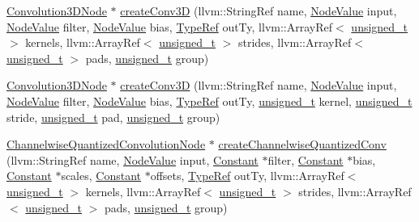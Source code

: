 \begin{DoxyCompactItemize}
\item 
\hyperlink{classglow_1_1_convolution3_d_node}{Convolution3\+D\+Node} $\ast$ \hyperlink{classglow_1_1_function_a5eec756ea2779f3768102cd496cce846}{create\+Conv3D} (llvm\+::\+String\+Ref name, \hyperlink{structglow_1_1_node_value}{Node\+Value} input, \hyperlink{structglow_1_1_node_value}{Node\+Value} filter, \hyperlink{structglow_1_1_node_value}{Node\+Value} bias, \hyperlink{structglow_1_1_type}{Type\+Ref} out\+Ty, llvm\+::\+Array\+Ref$<$ \hyperlink{namespaceglow_a0ca574644e1e42ef193a9947fb4d8911}{unsigned\+\_\+t} $>$ kernels, llvm\+::\+Array\+Ref$<$ \hyperlink{namespaceglow_a0ca574644e1e42ef193a9947fb4d8911}{unsigned\+\_\+t} $>$ strides, llvm\+::\+Array\+Ref$<$ \hyperlink{namespaceglow_a0ca574644e1e42ef193a9947fb4d8911}{unsigned\+\_\+t} $>$ pads, \hyperlink{namespaceglow_a0ca574644e1e42ef193a9947fb4d8911}{unsigned\+\_\+t} group)
\item 
\hyperlink{classglow_1_1_convolution3_d_node}{Convolution3\+D\+Node} $\ast$ \hyperlink{classglow_1_1_function_a29c34498d91c08a88e7f503bcb55646d}{create\+Conv3D} (llvm\+::\+String\+Ref name, \hyperlink{structglow_1_1_node_value}{Node\+Value} input, \hyperlink{structglow_1_1_node_value}{Node\+Value} filter, \hyperlink{structglow_1_1_node_value}{Node\+Value} bias, \hyperlink{structglow_1_1_type}{Type\+Ref} out\+Ty, \hyperlink{namespaceglow_a0ca574644e1e42ef193a9947fb4d8911}{unsigned\+\_\+t} kernel, \hyperlink{namespaceglow_a0ca574644e1e42ef193a9947fb4d8911}{unsigned\+\_\+t} stride, \hyperlink{namespaceglow_a0ca574644e1e42ef193a9947fb4d8911}{unsigned\+\_\+t} pad, \hyperlink{namespaceglow_a0ca574644e1e42ef193a9947fb4d8911}{unsigned\+\_\+t} group)
\item 
\hyperlink{classglow_1_1_channelwise_quantized_convolution_node}{Channelwise\+Quantized\+Convolution\+Node} $\ast$ \hyperlink{classglow_1_1_function_a94c1fee1a3b4e7779c7a1cee21592f0f}{create\+Channelwise\+Quantized\+Conv} (llvm\+::\+String\+Ref name, \hyperlink{structglow_1_1_node_value}{Node\+Value} input, \hyperlink{classglow_1_1_constant}{Constant} $\ast$filter, \hyperlink{classglow_1_1_constant}{Constant} $\ast$bias, \hyperlink{classglow_1_1_constant}{Constant} $\ast$scales, \hyperlink{classglow_1_1_constant}{Constant} $\ast$offsets, \hyperlink{structglow_1_1_type}{Type\+Ref} out\+Ty, llvm\+::\+Array\+Ref$<$ \hyperlink{namespaceglow_a0ca574644e1e42ef193a9947fb4d8911}{unsigned\+\_\+t} $>$ kernels, llvm\+::\+Array\+Ref$<$ \hyperlink{namespaceglow_a0ca574644e1e42ef193a9947fb4d8911}{unsigned\+\_\+t} $>$ strides, llvm\+::\+Array\+Ref$<$ \hyperlink{namespaceglow_a0ca574644e1e42ef193a9947fb4d8911}{unsigned\+\_\+t} $>$ pads, \hyperlink{namespaceglow_a0ca574644e1e42ef193a9947fb4d8911}{unsigned\+\_\+t} group)

\end{DoxyCompactItemize}
